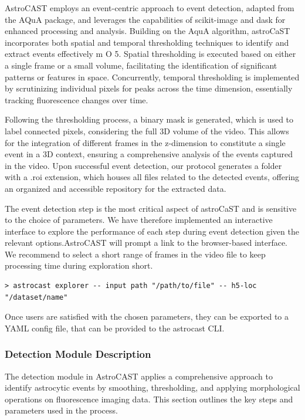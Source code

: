 \documentclass[utf8]{FrontiersinHarvard}
\newcommand{\fref}{ m O{} }{ (Figure~\ref{fig:#1}\IfValueT{#2}{\,#2})}
\begin{document}
    AstroCAST employs an event-centric approach to event detection, adapted from the AQuA package\citep{wang_event-based_2018}, and leverages the capabilities of scikit-image and dask for enhanced processing and analysis\citep{van_der_walt_scikit-image_2014,dask_development_team_dask_2016}. Building on the AquA algorithm, astroCaST incorporates both spatial and temporal thresholding techniques to identify and extract events effectively \fref{5}. Spatial thresholding is executed based on either a single frame or a small volume, facilitating the identification of significant patterns or features in space. Concurrently, temporal thresholding is implemented by scrutinizing individual pixels for peaks across the time dimension, essentially tracking fluorescence changes over time.

    Following the thresholding process, a binary mask is generated, which is used to label connected pixels, considering the full 3D volume of the video. This allows for the integration of different frames in the z-dimension to constitute a single event in a 3D context, ensuring a comprehensive analysis of the events captured in the video. Upon successful event detection, our protocol generates a folder with a .roi extension, which houses all files related to the detected events, offering an organized and accessible repository for the extracted data.

    The event detection step is the most critical aspect of astroCaST and is sensitive to the choice of parameters. We have therefore implemented an interactive interface to explore the performance of each step during event detection given the relevant options.AstroCAST will prompt a link to the browser-based interface. We recommend to select a short range of frames in the video file to keep processing time during exploration short.

    \begin{lstlisting}[style=bashStyle]
        > astrocast explorer -- input path "/path/to/file" -- h5-loc "/dataset/name"
    \end{lstlisting}

    Once users are satisfied with the chosen parameters, they can be exported to a YAML config file, that can be provided
    to the astrocast \ac{CLI}.

    \subsubsection{Detection Module Description}
    The detection module in AstroCAST applies a comprehensive approach to identify astrocytic events by smoothing,
    thresholding, and applying morphological operations on fluorescence imaging data. This section outlines the key steps
    and parameters used in the process.
\end{document}
